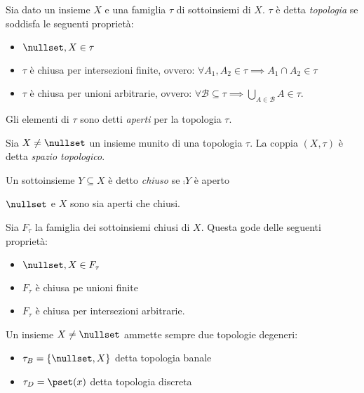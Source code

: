 


\begin{defn}[Topologia]
Sia dato un insieme $X$ e una famiglia $\tau$ di sottoinsiemi di $X$. $\tau$ è detta \emph{topologia} se soddisfa le seguenti proprietà:
\begin{itemize}
\item $\nullset,X\in\tau$ 
\item$\tau$ è chiusa per intersezioni finite, ovvero: $\forall A_1, A_2 \in \tau \implies A_1 \cap A_2 \in \tau$
\item $\tau$ è chiusa per unioni arbitrarie, ovvero: $\forall \mathcal B \subseteq \tau \implies \bigcup_{A\in\mathcal B} A \in \tau$.
\end{itemize}
Gli elementi di $\tau$ sono detti \emph{aperti} per la topologia $\tau$.
\end{defn}

\begin{defn}
Sia $X \neq \nullset$ un insieme munito di una topologia $\tau$. La coppia $(X,\tau)$ è detta \emph{spazio topologico}.
\end{defn}
\begin{defn}[Chiuso]
Un sottoinsieme $Y \subseteq X$ è detto \emph{chiuso} se $\comp Y$ è aperto
\end{defn}

\begin{oss}
$\nullset$ e $X$ sono sia aperti che chiusi.
\end{oss}

\begin{prop}
Sia $F_\tau$ la famiglia dei sottoinsiemi chiusi di $X$. Questa gode delle seguenti proprietà:
\begin{itemize}
\item $\nullset ,X \in F_\tau$ 
\item $F_\tau$ è chiusa pe unioni finite
\item $F_\tau$ è chiusa per intersezioni arbitrarie.
\end{itemize}
\end{prop}

\begin{oss}
Un insieme $X\neq\nullset$ ammette sempre due topologie degeneri:
\begin{itemize}
\item $\tau_B = \{\nullset,X\}$ detta topologia banale
\item $\tau_D = \pset(x)$ detta topologia discreta
\end{itemize}
\end{oss}

